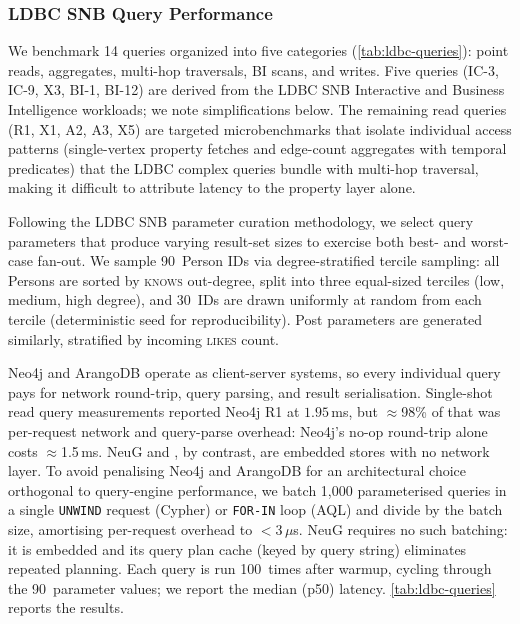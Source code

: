 \subsubsection{LDBC SNB Query Performance}
\label{sec:eval:property-ldbc}

We benchmark 14 queries organized into five categories
(\autoref{tab:ldbc-queries}): point reads, aggregates, multi-hop traversals,
BI scans, and writes.
Five queries (IC-3, IC-9, X3, BI-1, BI-12) are derived from the LDBC SNB
Interactive and Business Intelligence workloads; we note simplifications below.
The remaining read queries (R1, X1, A2, A3, X5) are targeted microbenchmarks
that isolate individual access patterns (single-vertex property fetches and
edge-count aggregates with temporal predicates) that the LDBC complex queries
bundle with multi-hop traversal, making it difficult to attribute latency to
the property layer alone.

Following the LDBC SNB parameter curation methodology, we select query
parameters that produce varying result-set sizes to exercise both best- and
worst-case fan-out.
We sample 90~Person IDs via degree-stratified tercile sampling: all Persons are
sorted by \textsc{knows} out-degree, split into three equal-sized terciles
(low, medium, high degree), and 30~IDs are drawn uniformly at random from each
tercile (deterministic seed for reproducibility).
Post parameters are generated similarly, stratified by incoming
\textsc{likes} count.

Neo4j and ArangoDB operate as client-server systems, so every individual query pays for network round-trip, query parsing, and result serialisation.
Single-shot read query measurements reported Neo4j R1 at $1.95$\,ms, but $\approx$98\% of that was per-request network and query-parse overhead: Neo4j's no-op round-trip alone costs $\approx$1.5\,ms.
NeuG and \project{}, by contrast, are embedded stores with no network layer.
To avoid penalising Neo4j and ArangoDB for an architectural choice orthogonal to query-engine performance, we batch 1,000 parameterised queries in a single \texttt{UNWIND} request (Cypher) or \texttt{FOR-IN} loop (AQL) and divide by the batch size, amortising per-request overhead to $<$3\,$\mu$s.
NeuG requires no such batching: it is embedded and its query plan cache (keyed by query string) eliminates repeated planning.
Each query is run 100~times after warmup, cycling through the 90~parameter
values; we report the median (p50) latency.
\autoref{tab:ldbc-queries} reports the results.

